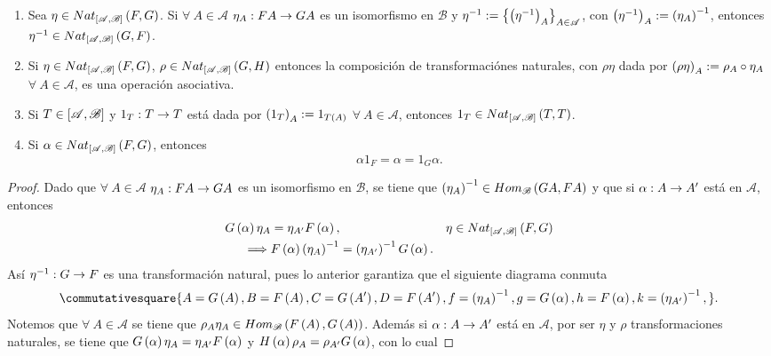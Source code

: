 \documentclass{article}
\begin{document}
\begin{enumerate}[label=\textbf{Ej \arabic*.}]
\begin{enumerate}
			\item Sea $\eta\in Nat_{\left[\mathscr{A},\mathscr{B}\right]}\left(F,G\right)$. Si $\forall\ A\in\mathscr{A}$ $\eta_{A}:FA\to GA$ es un isomorfismo en $\mathscr{B}$ y $\eta^{-1}:=\left\{\left(\eta^{-1}\right)_A\right\}_{A\in\mathscr{A}}$, con $\left(\eta^{-1}\right)_A:=\left(\eta_{A}\right)^{-1}$, entonces $\eta^{-1}\in Nat_{\left[\mathscr{A},\mathscr{B}\right]}\left(G,F\right)$.
			\item Si $\eta\in Nat_{\left[\mathscr{A},\mathscr{B}\right]}\left(F,G\right)$, $\rho\in Nat_{\left[\mathscr{A},\mathscr{B}\right]}\left(G,H\right)$ entonces la composición de transformaciónes naturales, con $\rho\eta$ dada por $\left(\rho\eta\right)_A:=\rho_A\circ\eta_A$ $\forall\ A\in\mathscr{A}$, es una operación asociativa.
			\item Si $T\in\left[\mathscr{A},\mathscr{B}\right]$ y $1_T:T\to T$ está dada por $\left(1_T\right)_A:=1_{T\left(A\right)}$ $\forall\ A\in\mathscr{A}$, entonces $1_T\in Nat_{\left[\mathscr{A},\mathscr{B}\right]}\left(T,T\right)$.
			\item Si $\alpha\in Nat_{\left[\mathscr{A},\mathscr{B}\right]}\left(F,G\right)$, entonces
			\begin{equation*}
				\alpha 1_F=\alpha=1_G \alpha.
			\end{equation*}
		\end{enumerate}
		\begin{proof}
			 Dado que $\forall\ A\in\mathscr{A}$ $\eta_{A}:FA\to GA$ es un isomorfismo en $\mathscr{B}$, se tiene que $\left(\eta_{A}\right)^{-1}\in Hom_{\mathscr{B}}\left(GA,FA\right)$ y que si $\alpha:A\to A'$ está en $\mathscr{A}$, entonces
			\begin{align*}
				G\left(\alpha\right)\eta_{A}&=\eta_{A'}F\left(\alpha\right), && \eta\in Nat_{\left[\mathscr{A},\mathscr{B}\right]}\left(F,G\right)\\
				\implies& F\left(\alpha\right)\left(\eta_{A}\right)^{-1}=\left(\eta_{A'}\right)^{-1}G\left(\alpha\right).
			\end{align*} 
		 Así $\eta^{-1}:G\to F$ es una transformación natural, pues lo anterior garantiza que el siguiente diagrama conmuta
		 \begin{equation*}
		 	\commutativesquare{A=G\lrprth{A},B=F\lrprth{A},C=G\lrprth{A'},D=F\lrprth{A'},f=\lrprth{\eta_{A}}^{-1},g=G\lrprth{\alpha},h=F\lrprth{\alpha},k=\lrprth{\eta_{A'}}^{-1},}.
		 \end{equation*}
	 	 Notemos que $\forall\ A\in\mathscr{A}$ se tiene que $\rho_A\eta_{A}\in Hom_{\mathscr{B}}\left(F\left(A\right),G\left(A\right)\right)$. Además si $\alpha:A\to A'$ está en $\mathscr{A}$, por ser $\eta$ y $\rho$ transformaciones naturales, se tiene que $G\left(\alpha\right)\eta_{A}=\eta_{A'}F\left(\alpha\right)$ y $H\left(\alpha\right)\rho_{A}=\rho_{A'}G\left(\alpha\right)$, con lo cual

\end{proof}
\end{enumerate}
\end{document}
